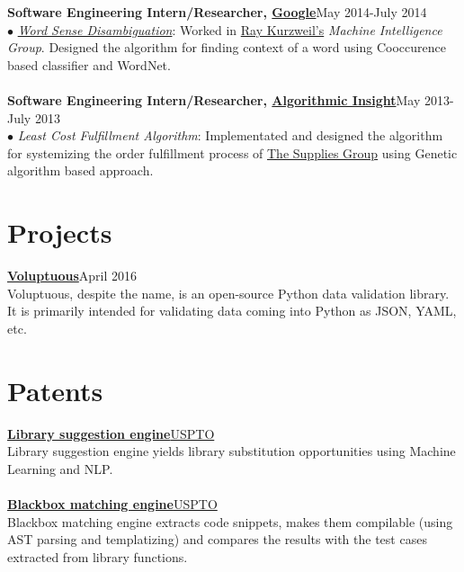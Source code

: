 \documentclass[margin,line]{resume}
\begin{document}
\begin{resume}
    {\bf Software Engineering Intern/Researcher, \href{https://www.google.com/}{Google}}\hfill May 2014-July 2014\\
      $\bullet$ \href{https://en.wikipedia.org/wiki/Word-sense_disambiguation}{\emph{Word Sense Disambiguation}}: Worked in \href{http://en.wikipedia.org/wiki/Ray_Kurzweil}{Ray Kurzweil's} \emph{Machine Intelligence Group}. Designed the algorithm for finding context of a word using Cooccurence based classifier and WordNet.\\\\
         {\bf Software Engineering Intern/Researcher, \href{http://tatrasdata.com/}{Algorithmic Insight}}\hfill May 2013-July 2013\\
      $\bullet$ \emph{Least Cost Fulfillment Algorithm}: Implementated and designed the algorithm for systemizing the order fulfillment process of \href{http://www.suppliesguys.com/}{The Supplies Group} using Genetic algorithm based approach.

\section{\mysidestyle \bf Projects}

 {\bf\href{https://github.com/alecthomas/voluptuous}{Voluptuous}}\hfill April 2016 \\
Voluptuous, despite the name, is an open-source Python data validation library. It is primarily intended for validating data coming into Python as JSON, YAML, etc.

\section{\mysidestyle \bf Patents}
 {\bf\href{https://patents.google.com/patent/US10048945B1/}{Library suggestion engine}}\hfill \href{https://www.uspto.gov/}{USPTO} \\
Library suggestion engine yields library substitution opportunities using Machine Learning and NLP. \\\\
 {\bf\href{https://patents.google.com/patent/US10114624B1/}{Blackbox matching engine}}\hfill \href{https://www.uspto.gov/}{USPTO} \\
Blackbox matching engine extracts code snippets, makes them compilable (using AST parsing and templatizing) and compares the results with the test cases extracted from library functions.


\end{resume}
\end{document}
